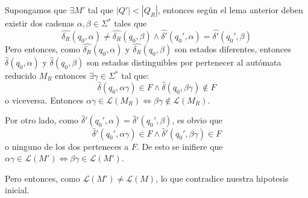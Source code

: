 \begin{demo}[\textwidth]
  Supongamos que \(\exists M'\) tal que \( |Q'| < |Q_R|\), entonces según el lema anterior deben existir dos cadenas \(\alpha,\beta\in\Sigma^*\) tales que
  \[
    \hat{\delta_R}(q_0,\alpha) \neq \hat{\delta_R}(q_0,\beta) \land \hat{\delta'}(q_0',\alpha) = \hat{\delta'}(q_0',\beta)
  \]
  Pero entonces, como \(\hat{\delta_R}(q_0,\alpha)\) y \(\hat{\delta_R}(q_0,\beta)\) son estados diferentes, entonces \(\hat{\delta}(q_0,\alpha)\) y \(\hat{\delta}(q_0,\beta)\) son estados distinguibles por pertenecer al autómata reducido \(M_R\) entonces \(\exists\gamma\in\Sigma^*\) tal que:
  \[
    \hat{\delta}(q_0,\alpha\gamma)\in F \land \hat{\delta}(q_0,\beta\gamma)\notin F
  \]
  o viceversa. Entonces \(\alpha\gamma\in\mathcal{L}(M_R) \iff \beta\gamma\notin\mathcal{L}(M_R)\).

  Por otro lado, como \(\hat\delta'(q_0',\alpha) = \hat\delta'(q_0',\beta)\), es obvio que \[
    \hat\delta'(q_0',\alpha\gamma)\in F\land \hat\delta'(q_0',\beta\gamma)\in F
  \] o ninguno de los dos perteneces a \(F\). De esto se inifiere que \(\alpha\gamma\in\mathcal{L}(M') \iff \beta\gamma\in\mathcal{L}(M')\).

  Pero entonces, como \(\mathcal{L}(M') \neq \mathcal{L}(M)\), lo que contradice nuestra hipotesis inicial.
\end{demo}